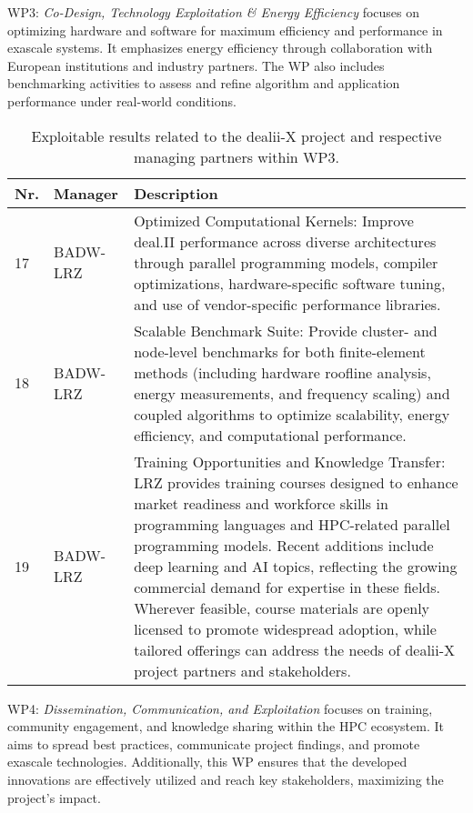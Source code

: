 \documentclass[a4paper,12pt]{article}
\begin{document}
\newpage

WP3: \textit{Co-Design, Technology Exploitation \& Energy Efficiency} focuses on optimizing hardware and software for maximum efficiency and performance in exascale systems. It emphasizes energy efficiency through collaboration with European institutions and industry partners. The WP also includes benchmarking activities to assess and refine algorithm and application performance under real-world conditions.

\begin{center}
    \small
    \renewcommand{\arraystretch}{1.25}
    \begin{longtable}{|l|p{2.5cm}|p{12cm}|}
    \caption{Exploitable results related to the dealii-X project and respective managing partners within WP3.}
    \label{tab:exploitable_results_WP3}
    \\
    \hline
    \textbf{Nr.} & \textbf{Manager} & \textbf{Description} \\
    \hline
    17 & BADW-LRZ &
    Optimized Computational Kernels: Improve deal.II performance across diverse architectures through parallel programming models, compiler optimizations, hardware-specific software tuning, and use of vendor-specific performance libraries.
    \\
    \hline
    18 & BADW-LRZ &
    Scalable Benchmark Suite: Provide cluster- and node-level benchmarks for both finite-element methods (including hardware roofline analysis, energy measurements, and frequency scaling) and coupled algorithms to optimize scalability, energy efficiency, and computational performance.
    \\
    \hline
    19 & BADW-LRZ &
    Training Opportunities and Knowledge Transfer: LRZ provides training courses designed to enhance market readiness and workforce skills in programming languages and HPC-related parallel programming models. Recent additions include deep learning and AI topics, reflecting the growing commercial demand for expertise in these fields. Wherever feasible, course materials are openly licensed to promote widespread adoption, while tailored offerings can address the needs of dealii-X project partners and stakeholders.
    \\
    \hline
    \end{longtable}
\end{center}

\newpage

WP4: \textit{Dissemination, Communication, and Exploitation} focuses on training, community engagement, and knowledge sharing within the HPC ecosystem. It aims to spread best practices, communicate project findings, and promote exascale technologies. Additionally, this WP ensures that the developed innovations are effectively utilized and reach key stakeholders, maximizing the project's impact.
\end{document}
